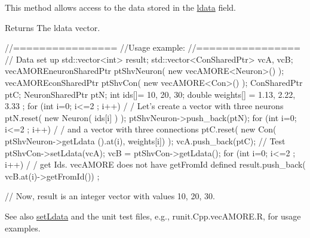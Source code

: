 This method allows access to the data stored in the \hyperlink{classvec_a_m_o_r_e_a1aa2ee42627e14994fed21bc6446993d}{ldata} field. \begin{DoxyReturn}{Returns}
The ldata vector.
\end{DoxyReturn}

\begin{DoxyCode}
        //================
        //Usage example:
        //================
                // Data set up
                                std::vector<int> result;
                                std::vector<ConSharedPtr> vcA, vcB;
                                vecAMOREneuronSharedPtr ptShvNeuron( new 
      vecAMORE<Neuron>() );
                                vecAMOREconSharedPtr    ptShvCon( new 
      vecAMORE<Con>() );
                                ConSharedPtr    ptC;
                                NeuronSharedPtr ptN;
                                int ids[]= {10, 20, 30};
                                double weights[] = {1.13, 2.22, 3.33 };
                                for (int i=0; i<=2 ; i++) {                             /
      / Let's create a vector with three neurons
                                        ptN.reset( new Neuron( ids[i] ) );
                                        ptShvNeuron->push_back(ptN);
                                }
                                for (int i=0; i<=2 ; i++) {                             /
      / and a vector with three connections
                                        ptC.reset( new Con( ptShvNeuron->getLdata
      ().at(i), weights[i]) );
                                        vcA.push_back(ptC);
                                }
                // Test
                        ptShvCon->setLdata(vcA);
                        vcB = ptShvCon->getLdata();
                        for (int i=0; i<=2 ; i++) {                                     /
      / get Ids. vecAMORE does not have getFromId defined
                                        result.push_back( vcB.at(i)->getFromId())
      ;
                        }

                // Now, result is an integer vector with values 10, 20, 30.
\end{DoxyCode}


\begin{DoxySeeAlso}{See also}
\hyperlink{classvec_a_m_o_r_e_ad1594c084d534c3de7acedd714f2e12a}{setLdata} and the unit test files, e.g., runit.Cpp.vecAMORE.R, for usage examples. 
\end{DoxySeeAlso}


